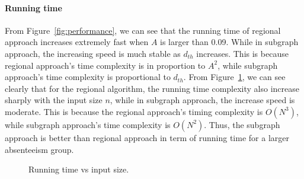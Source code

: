 \paragraph{Running time}From Figure~\ref{fig:performance}, we can see that the running time of regional approach increases extremely fast when $A$ is larger than 0.09. While in subgraph approach, the increasing speed is much stable as $d_{th}$ increases. This is because regional approach's time complexity is in proportion to $A^2$, while subgraph approach's time complexity is proportional to $d_{th}$. From Figure~\ref{fig:running_time}, we can see clearly that for the regional algorithm, the running time complexity also increase sharply with the input size $n$, while in subgraph approach, the increase speed is moderate. This is because the regional approach's timing complexity is $O(N^3)$, while subgraph approach's time complexity is $O(N^2)$. Thus, the subgraph approach is better  than regional approach in term of running time for a larger absenteeism group.
\begin{figure}[h]
	\centering
	\vspace{-1em}
	\caption{Running time vs input size.}
	\label{fig:running_time}
\end{figure}
